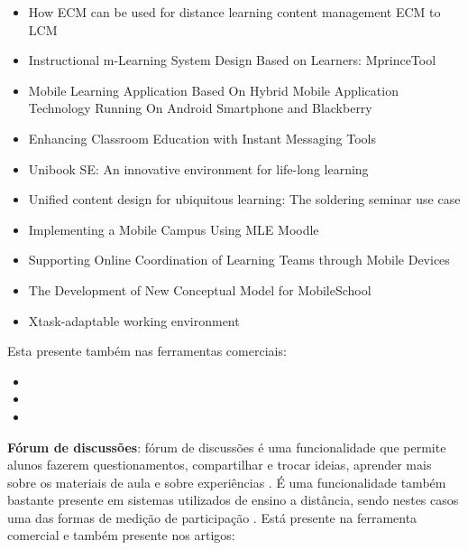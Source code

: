\vspace{-5mm}
\begin{itemize}
    \item How ECM can be used for distance learning content management ECM to LCM \cite{daoudi_how_2012}
    \item Instructional m-Learning System Design Based on Learners: MprinceTool \cite{fardoun_instructional_2010}
    \item Mobile Learning Application Based On Hybrid Mobile Application Technology Running On Android Smartphone and Blackberry \cite{setiabudi_mobile_2013}
    \item Enhancing Classroom Education with Instant Messaging Tools \cite{yao_enhancing_2011}
    \item Unibook SE: An innovative environment for life-long learning \cite{chimos_unibook_2012}
    \item Unified content design for ubiquitous learning: The soldering seminar use case \cite{rodriguez-alsina_unified_2010}
    \item Implementing a Mobile Campus Using MLE Moodle \cite{xhafa_implementing_2010}
    \item Supporting Online Coordination of Learning Teams through Mobile Devices \cite{roig-torres_supporting_2012}
    \item The Development of New Conceptual Model for MobileSchool \cite{hashim_development_2012}
    \item Xtask-adaptable working environment \cite{ketamo_xtask-adaptable_2002} 
\end{itemize}

\noindent
Esta presente também nas ferramentas comerciais: 

\vspace{-5mm}
\begin{itemize}
    \item {}
    \item {}
    \item {}
\end{itemize}

\textbf{Fórum de discussões}: fórum de discussões é uma funcionalidade que permite alunos fazerem questionamentos, compartilhar e trocar ideias, aprender mais sobre os materiais de aula e sobre experiências \cite{nguyen_comobile:_2006}. É uma funcionalidade também bastante presente em sistemas utilizados de ensino a distância, sendo nestes casos uma das formas de medição de participação \cite{chimos_unibook_2012, schmiedl_mobile_2010, ketamo_xtask-adaptable_2002}. Está presente na ferramenta comercial  e também presente nos artigos:

